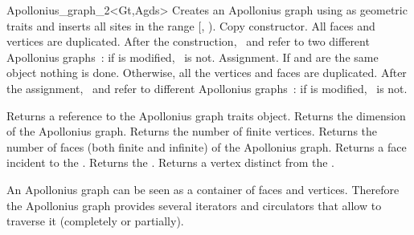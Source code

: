 \begin{ccRefClass}{Apollonius_graph_2<Gt,Agds>}
\ccCreation
{}
\ccThreeToTwo
%
%
 {Creates an Apollonius graph using  as
geometric traits and inserts all sites in the range
[, ).
}
%
{Copy constructor. All faces and vertices are duplicated. After the
  construction, 
  \ccVar\ and  refer to two different Apollonius graphs~: if
   is modified, \ccVar\ is not.}
%
{Assignment. If  and  are the same object
  nothing is done. Otherwise, all the vertices and faces are
  duplicated. After the assignment, \ccVar\ and  refer to
  different Apollonius graphs~: if  is modified, \ccVar\ is
  not.}




\ccAccessFunctions
%
{Returns a reference to the Apollonius graph traits object.}
\ccGlue
{}
{Returns the dimension of the Apollonius graph.}
\ccGlue
{}
{Returns the number of finite vertices.}
\ccGlue
{}
	 {Returns the number of faces (both finite and infinite) of the
	   Apollonius graph.}
\ccGlue
{}
{Returns a  face incident to the .}
\ccGlue
{}
{Returns the .}
\ccGlue
{}
{Returns a vertex distinct from  the .
}






An Apollonius graph can be seen as a container of faces and vertices.
Therefore the Apollonius graph provides several iterators and circulators
that allow to traverse it (completely or partially).




\end{ccRefClass}
